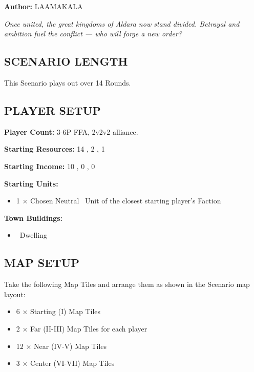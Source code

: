 
\begin{multicols*}{2}

\textbf{Author:} LAAMAKALA

\textit{Once united, the great kingdoms of Aldara now stand divided. Betrayal and ambition fuel the conflict — who will forge a new order?}  %

\subsection*{\MakeUppercase{Scenario Length}}
This Scenario plays out over 14 Rounds.

\subsection*{\MakeUppercase{Player Setup}}
\textbf{Player Count:} 3-6P FFA, 2v2v2 alliance.

\textbf{Starting Resources:} 14 , 2 , 1 

\textbf{Starting Income:} 10 , 0 , 0 

\textbf{Starting Units:}

\begin{itemize}
  \item 1 × Chosen Neutral \bronze\ Unit of the closest starting player's Faction
\end{itemize}

\textbf{Town Buildings:}
\begin{itemize}
  \item \bronze\ Dwelling
\end{itemize}

\subsection*{\MakeUppercase{Map Setup}}
Take the following Map Tiles and arrange them as shown in the Scenario map layout:

\begin{itemize}
  \item 6 × Starting (I) Map Tiles
  \item 2 × Far (II-III) Map Tiles for each player
  \item 12 × Near (IV-V) Map Tiles
  \item 3 × Center (VI-VII) Map Tiles
\end{itemize}


\end{multicols*}
